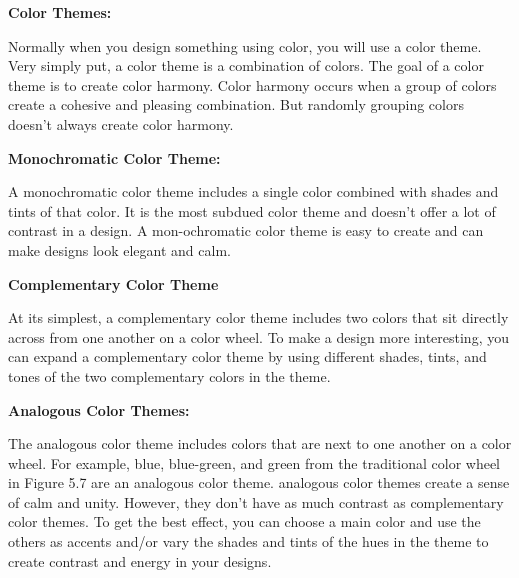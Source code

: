 \documentclass{report}
\begin{document}
          \bigbreak \noindent \bigbreak \noindent 
          \begin{Large}
            \textbf{Color Themes:}
          \end{Large}
          \bigbreak \noindent 
           Normally when you design something using color, you will use a color theme. Very simply put, a color theme is a combination of colors. The goal of a color theme is to create color harmony.
          \bigbreak \noindent 
           Color harmony occurs when a group of colors create a cohesive and pleasing combination. But randomly grouping colors doesn’t always create color harmony.
          \bigbreak \noindent 
          
          \bigbreak \noindent \bigbreak \noindent 
          \begin{large}
            \textbf{Monochromatic Color Theme:} 
          \end{large}
          \bigbreak \noindent 
           A monochromatic color theme includes a single color combined with shades and tints of that color. It is the most subdued color theme and doesn’t offer a lot of contrast in a design.
          \bigbreak \noindent 
           A mon-ochromatic color theme is easy to create and can make designs look elegant and calm.

          \bigbreak \noindent \bigbreak \noindent 
          \begin{large}
            \textbf{Complementary Color Theme}
          \end{large}
          \bigbreak \noindent 
           At its simplest, a complementary color theme includes two colors that sit directly across from one another on a color wheel.
          \bigbreak \noindent 
           To make a design more interesting, you can expand a complementary color theme by using different shades, tints, and tones of the two complementary colors in the theme.

          \bigbreak \noindent \bigbreak \noindent 
          \begin{large}
            \textbf{Analogous Color Themes:}
          \end{large}
          \bigbreak \noindent 
           The analogous color theme includes colors that are next to one another on a color wheel. For example, blue, blue-green, and green from the traditional color wheel in Figure 5.7 are an analogous color theme.
          \bigbreak \noindent 
          analogous color themes create a sense of calm and unity. However, they don’t have as much contrast as complementary color themes. To get the best effect, you can choose a main color and use the others as accents and/or vary the shades and tints of the hues in the theme to create contrast and energy in your designs.
\end{document}
